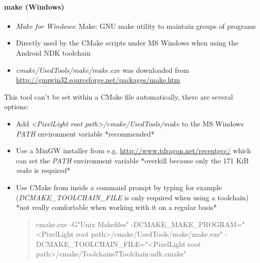 \paragraph{make (Windows)}
\begin{itemize}
\item{\emph{Make for Windows}: Make: GNU make utility to maintain groups of programs}
\item{Directly used by the CMake scripts under MS Windows when using the Android NDK toolchain}
\item{\emph{cmake/UsedTools/make/make.exe} was downloaded from \url{http://gnuwin32.sourceforge.net/packages/make.htm}}
\end{itemize}
This tool can't be set within a CMake file automatically, there are several options:
\begin{itemize}
\item{Add \emph{\textless PixelLight root path\textgreater /cmake/UsedTools/make} to the MS Windows \emph{PATH} environment variable *recommended*}
\item{Use a MinGW installer from e.g. \url{http://www.tdragon.net/recentgcc/} which can set the \emph{PATH} environment variable *overkill because only the 171 KiB \emph{make} is required*}
\item{Use CMake from inside a command prompt by typing for example (\emph{DCMAKE\_TOOLCHAIN\_FILE} is only required when using a toolchain) *not really comfortable when working with it on a regular basis*
\begin{quotation}
cmake.exe -G"Unix Makefiles" -DCMAKE\_MAKE\_PROGRAM="<PixelLight root path>/cmake/UsedTools/make/make.exe" -DCMAKE\_TOOLCHAIN\_FILE="<PixelLight root path>/cmake/Toolchains7Toolchain-ndk.cmake"
\end{quotation}}
\end{itemize}




